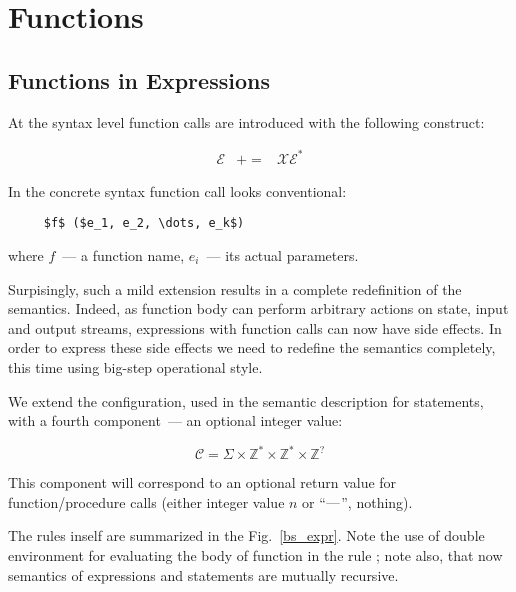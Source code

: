 \section{Functions}

\subsection{Functions in Expressions}

At the syntax level function calls are introduced with the following construct: 

\[
\begin{array}{rcl}
  \mathscr E & += & \mathscr X \mathscr E^*
\end{array}
\]

In the concrete syntax function call looks conventional:

\begin{lstlisting}
     $f$ ($e_1, e_2, \dots, e_k$)
\end{lstlisting}

where $f$~--- a function name, $e_i$~--- its actual parameters.

Surpisingly, such a mild extension results in a complete redefinition of the semantics. Indeed, as function body can perform
arbitrary actions on state, input and output streams, expressions with function calls can now have side effects. In order to express these
side effects we need to redefine the semantics completely, this time using big-step operational style.

We extend the configuration, used in the semantic description for statements, with a fourth component~--- an optional integer value:

\[
\mathscr C = \Sigma \times \mathbb Z^* \times \mathbb Z^* \times \mathbb Z^?
\]

This component will correspond to an optional return value for function/procedure calls (either integer value $n$ or ``$\hbox{---}$'', nothing).

The rules inself are summarized in the Fig.~\ref{bs_expr}. Note the use of double environment for evaluating the body of function in the rule
; note also, that now semantics of expressions and statements are mutually recursive.

\setarrow{\xRightarrow}

